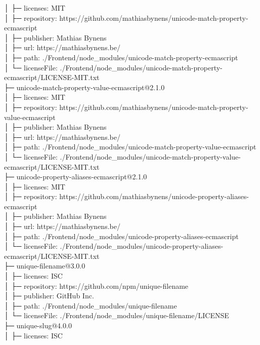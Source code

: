 │  ├─ licenses: MIT\\
│  ├─ repository: https://github.com/mathiasbynens/unicode-match-property-ecmascript\\
│  ├─ publisher: Mathias Bynens\\
│  ├─ url: https://mathiasbynens.be/\\
│  ├─ path: ./Frontend/node\_modules/unicode-match-property-ecmascript\\
│  └─ licenseFile: ./Frontend/node\_modules/unicode-match-property-ecmascript/LICENSE-MIT.txt\\
├─ unicode-match-property-value-ecmascript@2.1.0\\
│  ├─ licenses: MIT\\
│  ├─ repository: https://github.com/mathiasbynens/unicode-match-property-value-ecmascript\\
│  ├─ publisher: Mathias Bynens\\
│  ├─ url: https://mathiasbynens.be/\\
│  ├─ path: ./Frontend/node\_modules/unicode-match-property-value-ecmascript\\
│  └─ licenseFile: ./Frontend/node\_modules/unicode-match-property-value-ecmascript/LICENSE-MIT.txt\\
├─ unicode-property-aliases-ecmascript@2.1.0\\
│  ├─ licenses: MIT\\
│  ├─ repository: https://github.com/mathiasbynens/unicode-property-aliases-ecmascript\\
│  ├─ publisher: Mathias Bynens\\
│  ├─ url: https://mathiasbynens.be/\\
│  ├─ path: ./Frontend/node\_modules/unicode-property-aliases-ecmascript\\
│  └─ licenseFile: ./Frontend/node\_modules/unicode-property-aliases-ecmascript/LICENSE-MIT.txt\\
├─ unique-filename@3.0.0\\
│  ├─ licenses: ISC\\
│  ├─ repository: https://github.com/npm/unique-filename\\
│  ├─ publisher: GitHub Inc.\\
│  ├─ path: ./Frontend/node\_modules/unique-filename\\
│  └─ licenseFile: ./Frontend/node\_modules/unique-filename/LICENSE\\
├─ unique-slug@4.0.0\\
│  ├─ licenses: ISC\\
